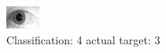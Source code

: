 \begin{figure}[h!]
\begin{center}
\includegraphics[width=0.60\columnwidth]{figures/ID1856_class_4_target_3.png}
\end{center}
\caption{ Classification: 4 actual target: 3}
\label{fig:ID1856_class_4_target_3}
\end{figure}
